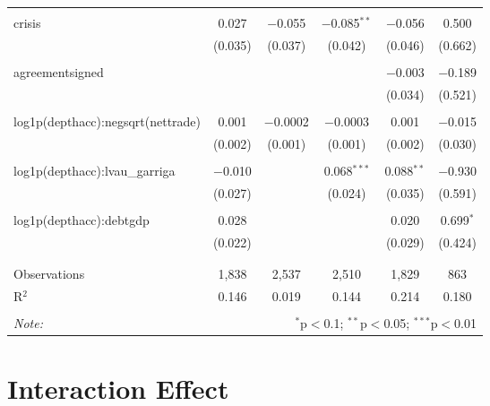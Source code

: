 \documentclass[]{article}
\begin{document}
\begin{table}[!htbp]
\begin{tabular}{@{\extracolsep{5pt}}lccccc}
  & & & & & \\ 
 crisis & 0.027 & $-$0.055 & $-$0.085$^{**}$ & $-$0.056 & 0.500 \\ 
  & (0.035) & (0.037) & (0.042) & (0.046) & (0.662) \\ 
  & & & & & \\ 
 agreementsigned &  &  &  & $-$0.003 & $-$0.189 \\ 
  &  &  &  & (0.034) & (0.521) \\ 
  & & & & & \\ 
 log1p(depthacc):negsqrt(nettrade) & 0.001 & $-$0.0002 & $-$0.0003 & 0.001 & $-$0.015 \\ 
  & (0.002) & (0.001) & (0.001) & (0.002) & (0.030) \\ 
  & & & & & \\ 
 log1p(depthacc):lvau\_garriga & $-$0.010 &  & 0.068$^{***}$ & 0.088$^{**}$ & $-$0.930 \\ 
  & (0.027) &  & (0.024) & (0.035) & (0.591) \\ 
  & & & & & \\ 
 log1p(depthacc):debtgdp & 0.028 &  &  & 0.020 & 0.699$^{*}$ \\ 
  & (0.022) &  &  & (0.029) & (0.424) \\ 
  & & & & & \\ 
\hline \\[-1.8ex] 
Observations & 1,838 & 2,537 & 2,510 & 1,829 & 863 \\ 
R$^{2}$ & 0.146 & 0.019 & 0.144 & 0.214 & 0.180 \\ 
\hline 
\hline \\[-1.8ex] 
\textit{Note:}  & \multicolumn{5}{r}{$^{*}$p$<$0.1; $^{**}$p$<$0.05; $^{***}$p$<$0.01} \\ 
\end{tabular} 
\end{table}

\section{Interaction Effect}\label{interaction-effect}
\end{document}
